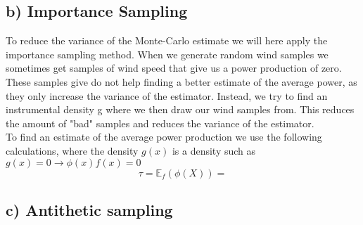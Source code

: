 \documentclass[a4paper]{article}
\begin{document}
\subsection*{b) Importance Sampling}
To reduce the variance of the Monte-Carlo estimate we will here apply the importance sampling method. When we generate random wind samples we sometimes get samples of wind speed that give us a power production of zero. These samples give do not help finding a better estimate of the average power, as they only increase the variance of the estimator. Instead, we try to find an instrumental density g where we then draw our wind samples from. This reduces the amount of "bad" samples and reduces the variance of the estimator. \\
\newline
\noindent To find an estimate of the average power production we use the following calculations, where the density $g(x)$ is a density such as $g(x) = 0 \rightarrow \phi(x)f(x) = 0$
\begin{equation}
    \tau = \mathbb{E}_f(\phi(X)) = 
\end{equation}

\subsection*{c) Antithetic sampling}
\end{document}
